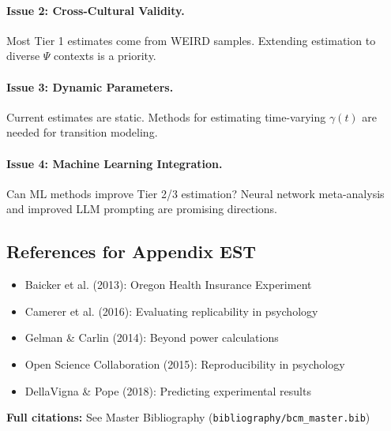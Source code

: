\paragraph{Issue 2: Cross-Cultural Validity.}
Most Tier 1 estimates come from WEIRD samples. Extending estimation to
diverse $\Psi$ contexts is a priority.

\paragraph{Issue 3: Dynamic Parameters.}
Current estimates are static. Methods for estimating time-varying $\gamma(t)$
are needed for transition modeling.

\paragraph{Issue 4: Machine Learning Integration.}
Can ML methods improve Tier 2/3 estimation? Neural network meta-analysis
and improved LLM prompting are promising directions.


\subsection{References for Appendix EST}
\label{sec:BBB-references}

\begin{itemize}[nosep]
    \item Baicker et al. (2013): Oregon Health Insurance Experiment
    \item Camerer et al. (2016): Evaluating replicability in psychology
    \item Gelman \& Carlin (2014): Beyond power calculations
    \item Open Science Collaboration (2015): Reproducibility in psychology
    \item DellaVigna \& Pope (2018): Predicting experimental results
\end{itemize}

\textbf{Full citations:} See Master Bibliography (\texttt{bibliography/bcm\_master.bib})


